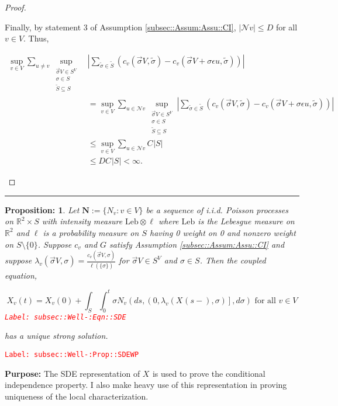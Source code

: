 \documentclass[12pt]{article}
\newcommand{\mb}{\mathbb}
\newcommand{\mc}{\mathcal}
\newcommand{\te}{\text}
\newcommand{\ep}{\epsilon}
\newcommand{\tr}{\textcolor{red}}
\newcommand{\labe}[1]{\tr{\texttt{Label: #1}}}
\newcommand{\purpose}{\textbf{Purpose: }}
\newcommand{\lin}{\rule{\linewidth}{0.4 pt}}
\newcommand{\defeq}{:=}								%
\newcommand{\neigh}{\mc{N}}					%
\renewcommand{\v}{v}							%
\newcommand{\vv}{u}								%
\renewcommand{\S}{S}							%
\newcommand{\s}{\sigma}							%
\newcommand{\sv}{\vec{\s}}						%
\newcommand{\ev}{\ep}							%
\renewcommand{\t}{t}							%
\renewcommand{\ss}[1]{^{#1}}					%
\newcommand{\degr}{D}								%
\newcommand{\poiss}[1]{N_{#1}}						%
\newcommand{\poisses}{\mathbf{N}}				%
\newcommand{\leb}{\te{Leb}}							%
\renewcommand{\SS}{\tilde{\S}}						%
\renewcommand{\ss}{\tilde{\s}}					%
\renewcommand{\G}{G}								%
\newcommand{\V}{V}									%
\renewcommand{\tt}{s}								%
\newcommand{\XState}[1]{\S^{#1}}				%
\newcommand{\rxvt}[2]{X_{#1}{(#2)}}					%
\newcommand{\rxvts}[2]{X_{#1}{#2}}					%
\newcommand{\IGr}[1]{c_{#1}}						%
\newcommand{\rate}[1]{\lambda_{#1}}					%
\newcommand{\const}[1]{C_{#1}}						%
\newcommand{\Sm}{\ell}								%
\newtheorem{prop}[thms]{Proposition: }
\begin{document}
\begin{proof}
\begin{enumerate}[i)]
Finally, by statement 3 of Assumption \ref{subsec::Assum:Assu::CI}, \(|\neigh{\v}| \leq \degr\) for all \(\v \in \V\). Thus,

\begin{align*}
\sup_{\v\in \V}\sum_{\vv \neq \v} \sup_{\substack{\sv{}{\V} \in \S^\V\\ \s\in \S\\ \SS\subseteq \S}}& \left|\sum_{\ss \in \SS} (\IGr{\v}(\sv{}{\V},\ss) - \IGr{\v}(\sv{}{\V}+\s\ev{\vv},\ss))\right|\\
&  = \sup_{\v\in \V}\sum_{\vv\in \neigh{\v}} \sup_{\substack{\sv{}{\V} \in \S^\V\\ \s\in \S\\ \SS\subseteq \S}} \left|\sum_{\ss \in \SS} (\IGr{\v}(\sv{}{\V},\ss) - \IGr{\v}(\sv{}{\V}+\s\ev{\vv},\ss))\right|\\
&\leq \sup_{\v\in \V} \sum_{\vv \in \neigh{\v}} \const{}|\S|\\
&\leq \degr \const{}|\S| < \infty.
\end{align*}


\end{enumerate}
\end{proof}

\lin

\begin{prop}
Let \(\poisses \defeq \{\poiss{\v}:\v\in \V\}\) be a sequence of i.i.d. Poisson processes on \(\mb{R}^2\times \S\) with intensity measure \(\leb\otimes \Sm\) where \(\leb\) is the Lebesgue measure on \(\mb{R}^2\) and \(\Sm\) is a probability measure on \(\S\) having 0 weight on 0 and nonzero weight on \(\S\setminus \{0\}\). Suppose \(\IGr{\v}\) and \(\G\) satisfy Assumption \ref{subsec::Assum:Assu::CI} and suppose \(\rate{\v}(\sv{}{\V},\s) = \frac{\IGr{\v}(\sv{}{\V},\s)}{\Sm(\{\s\})}\) for \(\sv{}{\V} \in \S^\V\) and \(\s \in \S\). Then the coupled equation,

\begin{equation}
\rxvt{\v}{\t} = \rxvt{\v}{0} + \int_\S\int_0^\t \s\poiss{\v}\left(d\tt,\left(0,\rate{\v}(\rxvt{}{\tt-},\s)\right],d\s\right) \te{ for all }\v \in \V
\label{subsec::Well-:Eqn::SDE}
\end{equation}
\labe{subsec::Well-:Eqn::SDE}

has a unique strong solution.
\label{subsec::Well-:Prop::SDEWP}
\end{prop}
\labe{subsec::Well-:Prop::SDEWP}

\purpose The SDE representation of \(\rxvts{}{}\) is used to prove the conditional independence property. I also make heavy use of this representation in proving uniqueness of the local characterization.
\end{document}
